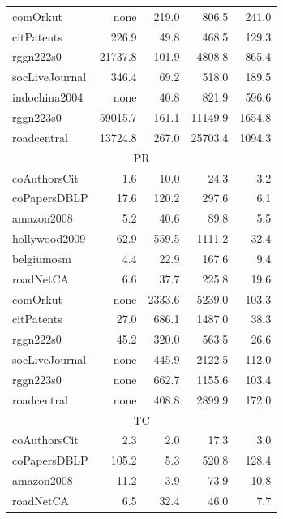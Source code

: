 \begin{table}[tbp]
\begin{center}
{\begin{tabular}{|l|r|r|r|r|}
        \rowcolor{black!10} comOrkut& none&219.0&806.5&241.0\\
        \rowcolor{black!2 } citPatents&226.9&49.8&468.5&129.3\\
        \rowcolor{black!10} rggn222s0&21737.8&101.9&4808.8&865.4\\
        \rowcolor{black!2 } socLiveJournal&346.4&69.2&518.0&189.5\\
        \rowcolor{black!10} indochina2004& none&40.8&821.9&596.6\\
        \rowcolor{black!2 } rggn223s0&59015.7&161.1&11149.9&1654.8\\
        \rowcolor{black!10} roadcentral&13724.8&267.0&25703.4&1094.3\\
        \hline
        \hline
        \multicolumn{5}{|c|}{PR} \\
        \hline
        \rowcolor{black!10} coAuthorsCit&1.6&10.0&24.3&3.2\\
        \rowcolor{black!2 } coPapersDBLP&17.6&120.2&297.6&6.1\\
        \rowcolor{black!10} amazon2008&5.2&40.6&89.8&5.5\\
        \rowcolor{black!2 } hollywood2009&62.9&559.5&1111.2&32.4\\
        \rowcolor{black!10} belgiumosm&4.4&22.9&167.6&9.4\\
        \rowcolor{black!2 } roadNetCA&6.6&37.7&225.8&19.6\\
        \rowcolor{black!10} comOrkut& none&2333.6&5239.0&103.3\\
        \rowcolor{black!2 } citPatents&27.0&686.1&1487.0&38.3\\
        \rowcolor{black!10} rggn222s0&45.2&320.0&563.5&26.6\\
        \rowcolor{black!2 } socLiveJournal& none&445.9&2122.5&112.0\\
        \rowcolor{black!10} rggn223s0& none&662.7&1155.6&103.4\\
        \rowcolor{black!2 } roadcentral& none&408.8&2899.9&172.0\\
        \hline
        \hline
        \multicolumn{5}{|c|}{TC} \\
        \hline
        \rowcolor{black!10} coAuthorsCit&2.3&2.0&17.3&3.0\\
        \rowcolor{black!2 } coPapersDBLP&105.2&5.3&520.8&128.4\\
        \rowcolor{black!10} amazon2008&11.2&3.9&73.9&10.8\\
        \rowcolor{black!2 } roadNetCA&6.5&32.4&46.0&7.7\\

\end{tabular}}
\end{center}
\end{table}
